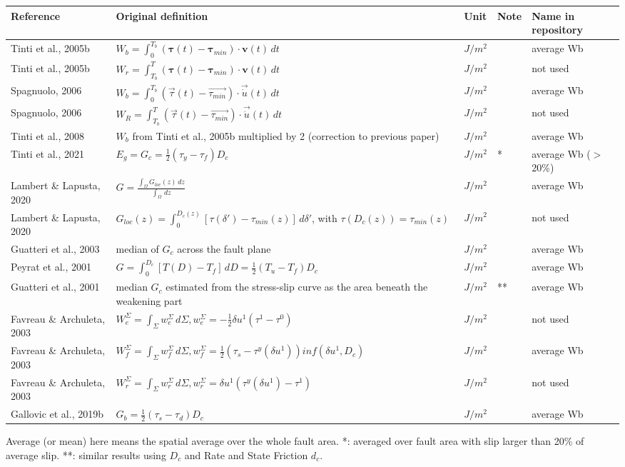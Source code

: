 \documentclass{article}
\begin{document}
\begin{longtable}{|p{4 cm}|p{8 cm}|p{1.25 cm}|p{1.25 cm}|p{1.5 cm}|}
\hline
\textbf{Reference} & \textbf{Original definition} & \textbf{Unit} & \textbf{Note} & \textbf{Name in repository} \\ \hline
Tinti et al., 2005b & \( \displaystyle W_b = \int_{0}^{T_b} (\bm{\tau}(t)-\bm{\tau}_{min})\cdot \bm{v}(t)\,dt \) & $J/m^2$ & & average Wb \\
Tinti et al., 2005b & \( \displaystyle W_r = \int_{T_b}^{T} (\bm{\tau}(t)-\bm{\tau}_{min})\cdot \bm{v}(t)\,dt \) & $J/m^2$ & & not used \\
Spagnuolo, 2006 & \( \displaystyle W_b = \int_{0}^{T_b} (\vec{\tau}(t)-\vec{\tau_{min}})\cdot \vec{\dot{u}}(t)\,dt \) & $J/m^2$ & & average Wb \\
Spagnuolo, 2006 & \( \displaystyle W_R = \int_{T_b}^{T} (\vec{\tau}(t)-\vec{\tau_{min}})\cdot \vec{\dot{u}}(t)\,dt \) & $J/m^2$ & & not used \\
Tinti et al., 2008 & $W_b$ from Tinti et al., 2005b multiplied by 2 (correction to previous paper) & $J/m^2$ & & average Wb \\
Tinti et al., 2021 & \(\displaystyle E_g = G_c = \frac{1}{2} (\tau_y-\tau_f) D_c\) & $J/m^2$ & * & average Wb ($>$20\%) \\
Lambert \& Lapusta, 2020 & \( \displaystyle G = \frac{\int_{\Omega} G_{loc}(z) \,dz}{\int_{\Omega}\,dz} \) & $J/m^2$ & & average Wb \\
Lambert \& Lapusta, 2020 & \( \displaystyle G_{loc}(z) = \int_{0}^{D_c (z)} [\tau(\delta')-\tau_{min}(z)]\,d\delta' \), with $\tau(D_c(z)) = \tau_{min}(z)$ & $J/m^2$ & & not used \\
Guatteri et al., 2003 & median of $G_c$ across the fault plane & $J/m^2$ & & average Wb \\
Peyrat et al., 2001 & \( \displaystyle G=\int_{0}^{D_c} [T(D)-T_f]\,dD = \frac{1}{2}(T_u-T_f)D_c \) & $J/m^2$ & & average Wb \\
Guatteri et al., 2001 & median $G_c$ estimated from the stress-slip curve as the area beneath the weakening part & $J/m^2$ & ** & average Wb \\
Favreau \& Archuleta, 2003 & \( \displaystyle W_e^\Sigma = \int_{\Sigma} w_e^\Sigma\,d\Sigma, w_e^\Sigma = -\frac{1}{2} \delta u^1 (\tau^1-\tau^0) \) & $J/m^2$ & & not used \\
Favreau \& Archuleta, 2003 & \( \displaystyle W_f^\Sigma = \int_{\Sigma} w_f^\Sigma\,d\Sigma, w_f^\Sigma = \frac{1}{2} (\tau_s-\tau^y(\delta u^1)) inf(\delta u^1, D_c) \) & $J/m^2$ & & average Wb \\
Favreau \& Archuleta, 2003 & \( \displaystyle W_r^\Sigma = \int_{\Sigma} w_r^\Sigma\,d\Sigma, w_r^\Sigma = \delta u^1 (\tau^y (\delta u^1)-\tau^1) \) & $J/m^2$ & & not used \\
Gallovic et al., 2019b & \( \displaystyle G_b =\frac{1}{2}(\tau_s-\tau_d)D_c  \) & $J/m^2$ & & average Wb \\
\hline
\end{longtable}
Average (or mean) here means the spatial average over the whole fault area. *: averaged over fault area with slip larger than 20\% of average slip. **: similar results using $D_c$ and Rate and State Friction $d_c$.
\end{document}
